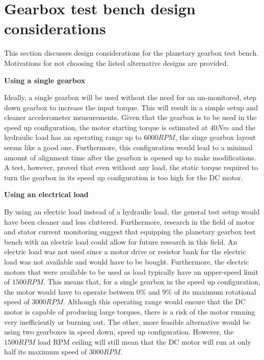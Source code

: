 
\chapter{Gearbox test bench design considerations } \label{A:testbench}

This section discusses design considerations for the planetary gearbox test bench. Motivations for not choosing the listed alternative designs are provided.

\textbf{Using a single gearbox}

Ideally, a single gearbox will be used without the need for an un-monitored, step down gearbox to increase the input torque. This will result in a simple setup and cleaner accelerometer measurements. Given that the gearbox is to be used in the speed up configuration, the motor starting torque is estimated at $40Nm$ and the hydraulic load has an operating range up to $6000RPM$, the singe gearbox layout seems like a good one. Furthermore, this configuration would lead to a minimal amount of alignment time after the gearbox is opened up to make modifications. A test, however, proved that even without any load, the static torque required to turn the gearbox in its speed up configuration is too high for the DC motor. 


\textbf{Using an electrical load}

By using an electric load instead of a hydraulic load, the general test setup would have been cleaner and less cluttered. Furthermore, research in the field of motor and stator current monitoring \citep{Nie2013} suggest that equipping the planetary gearbox test bench with an electric load could allow for future research in this field. An electric load was not used since a motor drive or resistor bank for the electric load was not available and would have to be bought. Furthermore, the electric motors that were available to be used as load typically have an upper-speed limit of $1500RPM$. This means that, for a single gearbox in the speed up configuration, the motor would have to operate between $0\%$ and $9\%$ of its maximum rotational speed of $3000RPM$. Although this operating range would ensure that the DC motor is capable of producing large torques, there is a risk of the motor running very inefficiently or burning out. The other, more feasible alternative would be using two gearboxes in speed down, speed up configuration. However, the $1500RPM$ load RPM ceiling will still mean that the DC motor will run at only half its maximum speed of $3000RPM$.


